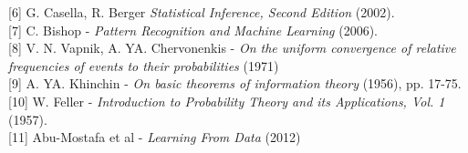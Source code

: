 \documentclass{report}
\begin{document}
[6] G. Casella, R. Berger \textit{Statistical Inference, Second Edition} (2002). \\

[7] C. Bishop - \textit{Pattern Recognition and Machine Learning} (2006). \\

[8] V. N. Vapnik, A. YA. Chervonenkis - \textit{On the uniform convergence of relative frequencies of events to their probabilities} (1971)\\

[9] A. YA. Khinchin -  \textit{On basic theorems of information theory} (1956), pp. 17-75.\\

[10] W. Feller - \textit{Introduction to Probability Theory and its Applications, Vol. 1}  (1957).\\

[11] Abu-Mostafa et al - \textit{Learning From Data} (2012)
\end{document}
